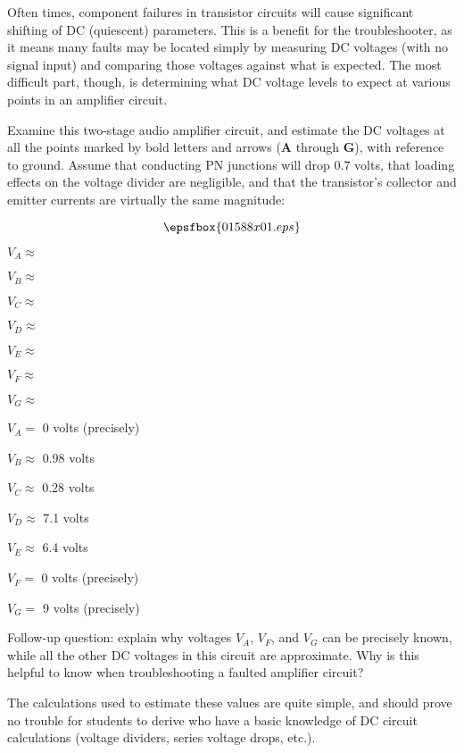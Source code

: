 

Often times, component failures in transistor circuits will cause significant shifting of DC (quiescent) parameters.  This is a benefit for the troubleshooter, as it means many faults may be located simply by measuring DC voltages (with no signal input) and comparing those voltages against what is expected.  The most difficult part, though, is determining what DC voltage levels to expect at various points in an amplifier circuit.

Examine this two-stage audio amplifier circuit, and estimate the DC voltages at all the points marked by bold letters and arrows ({\bf A} through {\bf G}), with reference to ground.  Assume that conducting PN junctions will drop 0.7 volts, that loading effects on the voltage divider are negligible, and that the transistor's collector and emitter currents are virtually the same magnitude:

$$\epsfbox{01588x01.eps}$$

$V_A \approx$

$V_B \approx$

$V_C \approx$

$V_D \approx$

$V_E \approx$

$V_F \approx$

$V_G \approx$

\vskip 10pt







$V_A =$ 0 volts (precisely)

$V_B \approx$ 0.98 volts

$V_C \approx$ 0.28 volts

$V_D \approx$ 7.1 volts

$V_E \approx$ 6.4 volts

$V_F =$ 0 volts (precisely)

$V_G =$ 9 volts (precisely)

\vskip 10pt

Follow-up question: explain why voltages $V_A$, $V_F$, and $V_G$ can be precisely known, while all the other DC voltages in this circuit are approximate.  Why is this helpful to know when troubleshooting a faulted amplifier circuit?







The calculations used to estimate these values are quite simple, and should prove no trouble for students to derive who have a basic knowledge of DC circuit calculations (voltage dividers, series voltage drops, etc.).




